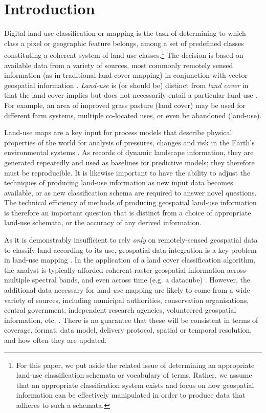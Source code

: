 \documentclass[]{interact}
\theoremstyle{plain}%
\theoremstyle{definition}
\theoremstyle{remark}
\begin{document}
\section{Introduction} %

Digital land-use classification or mapping is the task of determining to which class a pixel or geographic feature belongs, among a set of predefined classes constituting a coherent system of land use classes.\footnote{For this paper, we put aside the related issue of determining an appropriate land-use classification schemata or vocabulary of terms. Rather, we assume that an appropriate classification system exists and focus on how geospatial information can be effectively manipulated in order to produce data that adheres to such a schemata.} The decision is based on available data from a variety of sources, most commonly remotely sensed information (as in traditional land cover mapping) in conjunction with vector geospatial information \citep{rozenstein2011comparison}. \textit{Land-use} is (or should be) distinct from \textit{land cover} in that the land cover implies but does not necessarily entail a particular land-use \citep{fisher2005land,cihlar2001land}. For example, an area of improved grass pasture (land cover) may be used for different farm systems, multiple co-located uses, or even be abandoned (land-use).

Land-use maps are a key input for process models that describe physical properties of the world for analysis of pressures, changes and risk in the Earth's environmental systems \citep{bach2006accuracy,stehman1998design}. As records of dynamic landscape information, they are generated repeatedly and used as baselines for predictive models; they therefore must be reproducible. It is likewise important to have the ability to adjust the techniques of producing land-use information as new input data becomes available, or as new classification schema are required to answer novel questions. The technical efficiency of methods of producing geospatial land-use information is therefore an important question that is distinct from a choice of appropriate land-use schemata, or the accuracy of any derived information.

As it is demonstrably insufficient to rely \textit{only} on remotely-sensed geospatial data to classify land according to its use, geospatial data integration is a key problem in land-use mapping \citep{lillesand2015remote}. In the application of a land cover classification algorithm, the analyst is typically afforded coherent raster geospatial information across multiple spectral bands, and even across time (e.g. a datacube) \citep{kopp2019achieving}. However, the additional data necessary for land-\textit{use} mapping are likely to come from a wide variety of sources, including municipal authorities, conservation organisations, central government, independent research agencies, volunteered geospatial information, etc. \citep{rozenstein2011comparison}. There is no guarantee that these will be consistent in terms of coverage, format, data model, delivery protocol, spatial or temporal resolution, and how often they are updated.
\end{document}
